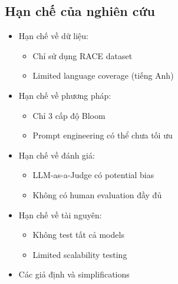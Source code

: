 \subsection{Hạn chế của nghiên cứu}
\begin{itemize}
    \item Hạn chế về dữ liệu:
    \begin{itemize}
        \item Chỉ sử dụng RACE dataset
        \item Limited language coverage (tiếng Anh)
    \end{itemize}
    \item Hạn chế về phương pháp:
    \begin{itemize}
        \item Chỉ 3 cấp độ Bloom
        \item Prompt engineering có thể chưa tối ưu
    \end{itemize}
    \item Hạn chế về đánh giá:
    \begin{itemize}
        \item LLM-as-a-Judge có potential bias
        \item Không có human evaluation đầy đủ
    \end{itemize}
    \item Hạn chế về tài nguyên:
    \begin{itemize}
        \item Không test tất cả models
        \item Limited scalability testing
    \end{itemize}
    \item Các giả định và simplifications
\end{itemize}

